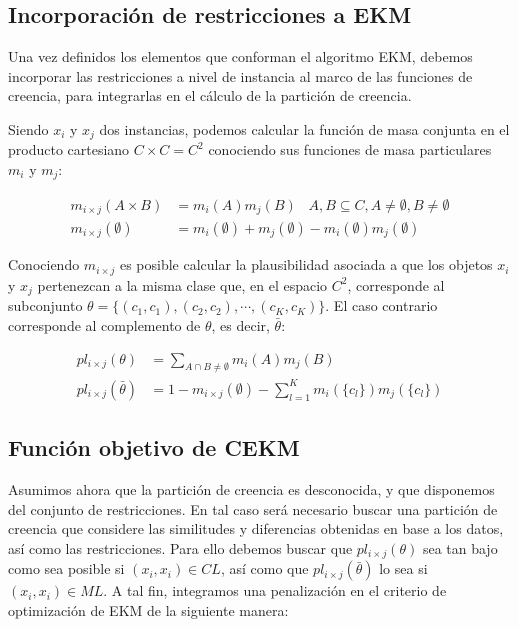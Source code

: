\subsection{Incorporación de restricciones a EKM}

Una vez definidos los elementos que conforman el algoritmo \acs{EKM}, debemos incorporar las restricciones a nivel de instancia al marco de las funciones de creencia, para integrarlas en el cálculo de la partición de creencia.

Siendo $x_i$ y $x_j$ dos instancias, podemos calcular la función de masa conjunta en el producto cartesiano $C \times C = C^2$ conociendo sus funciones de masa particulares $m_i$ y $m_j$:

\begin{equation}
\begin{split}
m_{i \times j}(A \times B) &= m_i(A)m_j(B) \;\;\; A,B \subseteq C, A \neq \emptyset, B \neq \emptyset\\
m_{i \times j}(\emptyset) & = m_i(\emptyset) + m_j(\emptyset) - m_i(\emptyset)m_j(\emptyset)
\end{split}
\label{eqn21}
\end{equation}

Conociendo $ m_{i \times j} $ es posible calcular la plausibilidad asociada a que los objetos $x_i$ y $x_j$ pertenezcan a la misma clase que, en el espacio $C^2$, corresponde al subconjunto $\theta = \{(c_1, c_1), (c_2, c_2), \cdots, (c_K, c_K)\}$. El caso contrario corresponde al complemento de $\theta$, es decir, $\bar{\theta}$:

\begin{equation}
\begin{split}
pl_{i\times j}(\theta) &= \sum_{A \cap B \ne \emptyset}m_i(A)m_j(B)\\
pl_{i\times j}(\bar{\theta}) &= 1 - m_{i\times j}(\emptyset) - \sum_{l=1}^{K} m_i(\{c_l\})m_j(\{c_l\})
\end{split}
\label{eqn23}
\end{equation}

\subsection{Función objetivo de CEKM}

Asumimos ahora que la partición de creencia es desconocida, y que disponemos del conjunto de restricciones. En tal caso será necesario buscar una partición de creencia que considere las similitudes y diferencias obtenidas en base a los datos, así como las restricciones. Para ello debemos buscar que $pl_{i\times j} (\theta)$ sea tan bajo como sea posible si $(x_i, x_i) \in CL$, así como que $pl_{i\times j} (\bar{\theta})$ lo sea si $(x_i, x_i) \in ML$. A tal fin, integramos una penalización en el criterio de optimización de \acs{EKM} de la siguiente manera:

